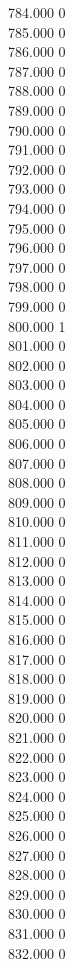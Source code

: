 { 784.000	0 \\
 785.000	0 \\
 786.000	0 \\
 787.000	0 \\
 788.000	0 \\
 789.000	0 \\
 790.000	0 \\
 791.000	0 \\
 792.000	0 \\
 793.000	0 \\
 794.000	0 \\
 795.000	0 \\
 796.000	0 \\
 797.000	0 \\
 798.000	0 \\
 799.000	0 \\
 800.000	1 \\
 801.000	0 \\
 802.000	0 \\
 803.000	0 \\
 804.000	0 \\
 805.000	0 \\
 806.000	0 \\
 807.000	0 \\
 808.000	0 \\
 809.000	0 \\
 810.000	0 \\
 811.000	0 \\
 812.000	0 \\
 813.000	0 \\
 814.000	0 \\
 815.000	0 \\
 816.000	0 \\
 817.000	0 \\
 818.000	0 \\
 819.000	0 \\
 820.000	0 \\
 821.000	0 \\
 822.000	0 \\
 823.000	0 \\
 824.000	0 \\
 825.000	0 \\
 826.000	0 \\
 827.000	0 \\
 828.000	0 \\
 829.000	0 \\
 830.000	0 \\
 831.000	0 \\
 832.000	0 \\
}
